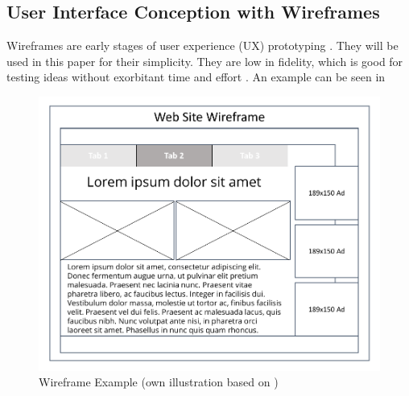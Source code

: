 

\subsection{User Interface Conception with Wireframes}

Wireframes are early stages of user experience (UX) prototyping \parencite[cf.][]{Rosenzweig.2015}. They will be used in this paper for their simplicity. They are low in fidelity, which is good for testing ideas without exorbitant time and effort \parencite[cf.][]{Platt.2016}. An example can be seen in 

\begin{figure}[H]
    \centering
    \includegraphics[height=.5\textheight]{img/WireFrameEx.pdf}
    \caption[Wireframe Example]{Wireframe Example (own illustration based on \cite{Rosenzweig.2015})}
    \label{fig:wrEx}
\end{figure}